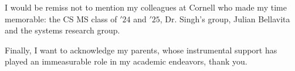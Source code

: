 \begin{acknowledgements}
    I would be remiss not to mention my colleagues at Cornell who made my time memorable: the CS MS class of
    \('24\) and \('25\), Dr. Singh's group, Julian Bellavita and the systems research group.

    Finally, I want to acknowledge my parents, whose instrumental support has played an immeasurable role in my academic
    endeavors, thank you.
\end{acknowledgements}
